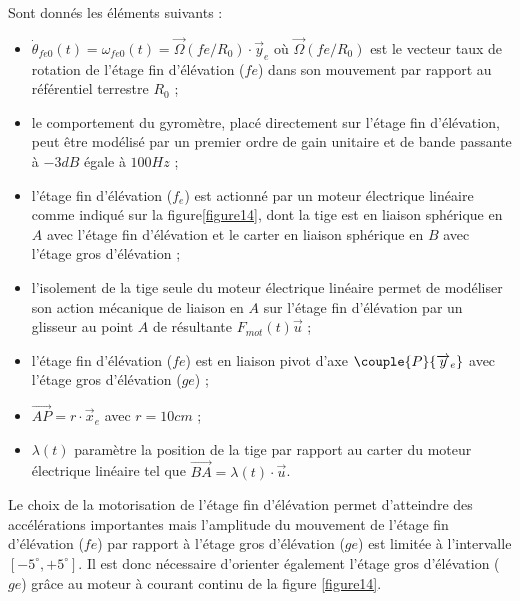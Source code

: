 Sont donnés les éléments suivants :
\begin{itemize}
\item $\dot{\theta}_{fe0}(t)=\omega_{fe0}(t)=\overrightarrow{\Omega}(fe/R_0)\cdot \overrightarrow{y}_e$ où $\overrightarrow{\Omega}(fe/R_0)$ est le vecteur taux de rotation de l'étage fin d'élévation ($fe$) dans
son mouvement par rapport au référentiel terrestre $R_0$ ;
\item le comportement du gyromètre, placé directement sur l'étage fin d'élévation, peut être modélisé par un
premier ordre de gain unitaire et de bande passante à $-3 dB$ égale à $100 Hz$ ;
\item l'étage fin d'élévation ($f_e$) est actionné par un moteur électrique linéaire comme indiqué sur la figure\ref{figure14},
dont la tige est en liaison sphérique en $A$ avec l'étage fin d'élévation et le carter en liaison sphérique en $B$ avec l'étage gros d'élévation ;
\item l'isolement de la tige seule du moteur électrique linéaire permet de modéliser son action mécanique de liaison
en $A$ sur l'étage fin d'élévation par un glisseur au point $A$ de résultante $F_{mot}(t)\overrightarrow{u}$ ;
\item l'étage fin d'élévation ($fe$) est en liaison pivot d'axe $\couple{P}{\overrightarrow{y}_e}$ avec l'étage gros d'élévation ($ge$) ;
\item $\overrightarrow{AP}=r\cdot \overrightarrow{x}_e$ avec $r=10cm$ ;
\item $\lambda(t)$ paramètre la position de la tige par rapport au carter du moteur électrique linéaire tel que $\overrightarrow{BA}=\lambda(t)\cdot \overrightarrow{u}$.
\end{itemize}

Le choix de la motorisation de l'étage fin d'élévation permet d'atteindre des accélérations importantes mais
l'amplitude du mouvement de l'étage fin d'élévation ($fe$) par rapport à l'étage gros d'élévation ($ge$) est limitée
à l'intervalle $\left[-5^{\circ}, +5^{\circ}\right]$. Il est donc nécessaire d'orienter également l'étage gros d'élévation ($ge$) grâce au moteur à courant continu de la figure \ref{figure14}.


